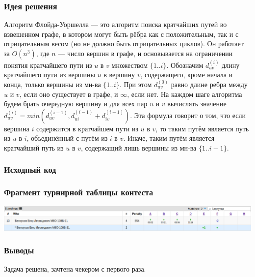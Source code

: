 \subsubsection*{Идея решения}

Алгоритм Флойда-Уоршелла --- это алгоритм поиска кратчайших путей во взвешенном графе, в котором могут быть рёбра как с положительным, так и с отрицательным весом (но не должно быть отрицательных циклов). Он работает за $O(n^3)$, где $n$ --- число вершин в графе, и основывается на ограничении понятия кратчайшего пути из $u$ в $v$ множеством $\{1..i\}$. Обозначим $d_{uv}^{(i)}$ длину кратчайшего пути из вершины $u$ в вершину $v$, содержащего, кроме начала и конца, только вершины из мн-ва $\{1..i\}$. При этом $d_{uv}^{(0)}$ равно длине ребра между $u$ и $v$, если оно существует в графе, и $\infty$, если нет. На каждом шаге алгоритма будем брать очередную вершину и для всех пар $u$ и $v$ вычислять значение $d_{uv}^{(i)} = min(d_{uv}^{(i-1)}, d_{ui}^{(i-1)} + d_{iv}^{(i-1)})$. Эта формула говорит о том, что если вершина $i$ содержится в кратчайшем пути из $u$ в $v$, то таким путём является путь из $u$ в $i$, объединённый с путём из $i$ в $v$. Иначе, таким путём является кратчайший путь из $u$ в $v$, содержащий лишь вершины из мн-ва $\{1..i-1\}$.

\subsubsection*{Исходный код}


\subsubsection*{Фрагмент турнирной таблицы контеста}
\begin{center}
\includegraphics[width=\textwidth]{standings/20220708/table.png}\newline\noindent
\end{center}

\subsubsection*{Выводы}

Задача решена, зачтена чекером с первого раза.

\pagebreak


